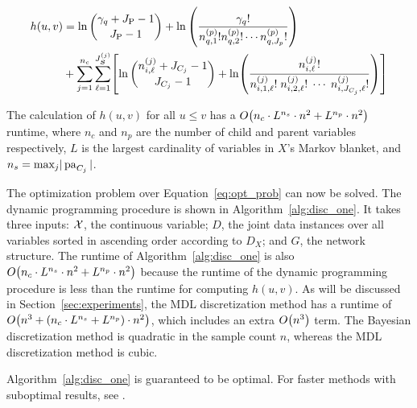 \begin{small}
  \begin{equation}
  \label{eqn:h_function}
  \begin{aligned}
  h(u,v) &=  \ln {{\gamma_{q} + J_\text{P} - 1}\choose{J_\text{P}-1}} + \ln \left( { {{\gamma_q}!}\over{ {n^{(p)}_{q,1} !} {n^{(p)}_{q,2} !} \cdots {n^{(p)}_{q,J_p} !}} } \right) \\
  & + \sum_{j=1}^{n_c} \sum_{\ell=1}^{J^{(j)}_{\bm{S}}} \brock{
    { \ln
            {{n^{(j)}_{i,\ell} + J_{C_j} - 1}\choose{J_{C_j}-1}}}
      +
      \ln \paren{ {
            \frac{
              {n^{(j)}_{i,\ell}}!
            }{
              {n^{(j)}_{i,1,\ell}!} \; {n^{(j)}_{i,2,\ell}!} \; \cdots \; {n^{(j)}_{i,J_{C_j},\ell}!}
            }
          }
          } }
  \end{aligned}
  \end{equation}
\end{small}

The calculation of $h(u,v)$ for all $u \leq v$ has a $\bigo \paren{ n_c \cdot {L}^{n_s} \cdot n^2 + {L}^{n_p} \cdot n^2 }$ runtime, where $n_c$ and $n_p$ are the number of child and parent variables respectively, $L$ is the largest cardinality of variables in $X$'s Markov blanket, and $n_s = \text{max}_j  |\operatorname{pa}_{C_j}|$.

The optimization problem over Equation~\ref{eq:opt_prob} can now be solved.
The dynamic programming procedure is shown in Algorithm~\ref{alg:disc_one}.
It takes three inputs: $\mathcal{X}$, the continuous variable; $D$, the joint data instances over all variables sorted in ascending order according to $D_X$; and $G$, the network structure.
The runtime of Algorithm~\ref{alg:disc_one} is also $\bigo \paren{ n_c \cdot {L}^{n_s} \cdot n^2 + {L}^{n_p} \cdot n^2 }$ because the runtime of the dynamic programming procedure is less than the runtime for computing $h(u,v)$.
As will be discussed in Section~\ref{sec:experiments}, the MDL discretization method has a runtime of $\bigo\paren{ n^3 + \paren{ n_c \cdot {L}^{n_s} + {L}^{n_p}} \cdot n^2 }$, which includes an extra $\bigo\paren{ n^3}$ term.
The Bayesian discretization method is quadratic in the sample count $n$, whereas the MDL discretization method is cubic.

Algorithm~\ref{alg:disc_one} is guaranteed to be optimal.
For faster methods with suboptimal results, see \citet{Boulle_2006}.

